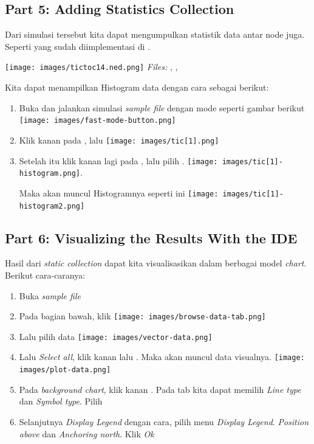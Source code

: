 \documentclass[conference]{IEEEtran}
\begin{document}
\subsection{Part 5: Adding Statistics Collection}
Dari simulasi tersebut kita dapat mengumpulkan statistik data antar node juga. Seperti yang sudah diimplementasi di .

\texttt{[image: images/tictoc14.ned.png]}\break
\textit{Files:} , , 

Kita dapat menampilkan Histogram data dengan cara sebagai berikut:
\begin{enumerate}
	\item Buka dan jalankan simulasi \textit{sample file}  dengan mode  seperti gambar berikut\break
	      \texttt{[image: images/fast-mode-button.png]}

	\item Klik kanan pada , lalu \break
	      \texttt{[image: images/tic[1].png]}

	\item Setelah itu klik kanan lagi pada , lalu pilih .\break
	      \texttt{[image: images/tic[1]-histogram.png]}. \break

	      Maka akan muncul Histogramnya seperti ini\break
	      \texttt{[image: images/tic[1]-histogram2.png]}
\end{enumerate}

\subsection{Part 6: Visualizing the Results With the IDE}
Hasil dari \textit{static collection} dapat kita visualisasikan dalam berbagai model \textit{chart}. Berikut cara-caranya:
\begin{enumerate}
	\item Buka \textit{sample file} 
	\item Pada bagian bawah, klik 
	      \texttt{[image: images/browse-data-tab.png]}
	      \newpage
	\item Lalu pilih  data
	      \texttt{[image: images/vector-data.png]}
	\item Lalu \textit{Select all}, klik kanan lalu . Maka akan muncul data visualnya.
	      \texttt{[image: images/plot-data.png]}

	\item Pada \textit{background chart}, klik kanan . Pada tab  kita dapat memilih \textit{Line type} dan \textit{Symbol type}. Pilih 
	\item Selanjutnya \textit{Display Legend} dengan cara, pilih menu  \textit{Display Legend}. \textit{Position above} dan \textit{Anchoring north}. Klik \textit{Ok}
\end{enumerate}
\end{document}
